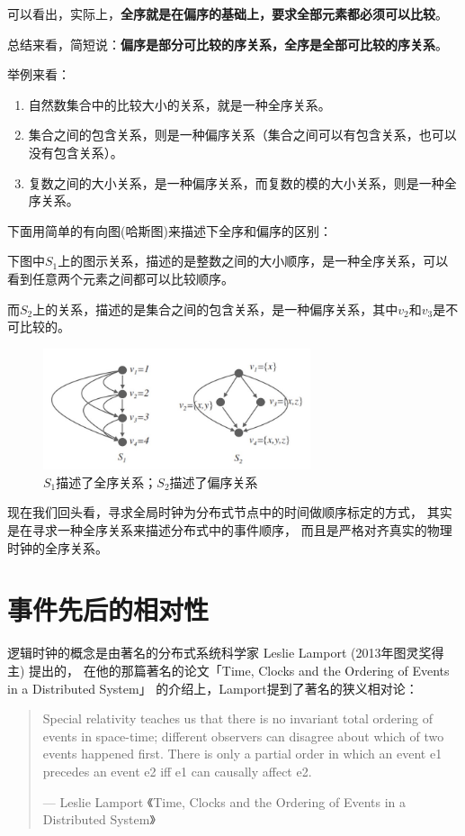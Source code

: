 \documentclass[cn,11pt,chinese]{elegantbook}
\begin{document}
可以看出，实际上，\textbf{全序就是在偏序的基础上，要求全部元素都必须可以比较}。

总结来看，简短说：\textbf{偏序是部分可比较的序关系，全序是全部可比较的序关系}。

举例来看：

\begin{enumerate}
    \item 自然数集合中的比较大小的关系，就是一种全序关系。
    \item 集合之间的包含关系，则是一种偏序关系（集合之间可以有包含关系，也可以没有包含关系）。
    \item 复数之间的大小关系，是一种偏序关系，而复数的模的大小关系，则是一种全序关系。
\end{enumerate}

下面用简单的有向图(哈斯图)来描述下全序和偏序的区别：

下图中$S_1$上的图示关系，描述的是整数之间的大小顺序，是一种全序关系，可以看到任意两个元素之间都可以比较顺序。

而$S_2$上的关系，描述的是集合之间的包含关系，是一种偏序关系，其中$v_2$和$v_3$是不可比较的。

\begin{figure}
    \centering
    \includegraphics[width=0.7\textwidth]{images/appendix-a-05.jpeg}
    \caption{$S_1$描述了全序关系；$S_2$描述了偏序关系}
\end{figure}

现在我们回头看，寻求全局时钟为分布式节点中的时间做顺序标定的方式， 其实是在寻求一种全序关系来描述分布式中的事件顺序， 而且是严格对齐真实的物理时钟的全序关系。

\section{事件先后的相对性}

逻辑时钟的概念是由著名的分布式系统科学家 Leslie Lamport (2013年图灵奖得主) 提出的， 在他的那篇著名的论文「Time, Clocks and the Ordering of Events in a Distributed System」 的介绍上，Lamport提到了著名的狭义相对论：

\begin{quote}
  Special relativity teaches us that there is no invariant total ordering of events in space-time; different observers can disagree about which of two events happened first. There is only a partial order in which an event e1 precedes an event e2 iff e1 can causally affect e2.
  \begin{flushright}
    \tiny{--- Leslie Lamport 《Time, Clocks and the Ordering of Events in a Distributed System》}
  \end{flushright}
\end{quote}
\end{document}
